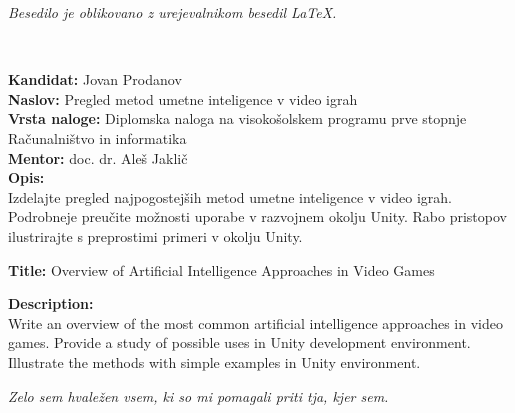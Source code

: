 \documentclass[a4paper, 12pt]{book}
\newcommand{\ttitle}{Pregled metod umetne inteligence v video igrah}
\newcommand{\ttitleEn}{Overview of Artificial Intelligence Approaches in Video Games}
\newcommand{\tauthor}{Jovan Prodanov}
\newcommand{\clearemptydoublepage}{\newpage{\pagestyle{empty}\cleardoublepage}}
\begin{document}
\begin{center}
\mbox{}\vfill
\emph{Besedilo je oblikovano z urejevalnikom besedil \LaTeX.}
\end{center}

\clearemptydoublepage

\thispagestyle{empty}
\
\vfill

\bigskip
\noindent\textbf{Kandidat:} \tauthor\\
\noindent\textbf{Naslov:} \ttitle\\
\noindent\textbf{Vrsta naloge:} Diplomska naloga na visokošolskem programu prve stopnje Računalništvo in informatika \\
\noindent\textbf{Mentor:} doc. dr. Aleš Jaklič\\

\bigskip
\noindent\textbf{Opis:}\\
Izdelajte pregled najpogostejših metod umetne inteligence v video igrah. Podrobneje preučite možnosti uporabe v razvojnem okolju Unity. Rabo pristopov ilustrirajte s preprostimi primeri v okolju Unity.

\bigskip
\noindent\textbf{Title:} \ttitleEn

\bigskip
\noindent\textbf{Description:}\\
Write an overview of the most common artificial intelligence approaches in video games. Provide a study of possible uses in Unity development environment. Illustrate the methods with simple examples in Unity environment.

\vfill

\vspace{2cm}

\clearemptydoublepage

\thispagestyle{empty}\mbox{}\vfill\null\it%
\noindent
Zelo sem hvaležen vsem, ki so mi pomagali priti tja, kjer sem.
\rm\normalfont

\clearemptydoublepage



\end{document}
